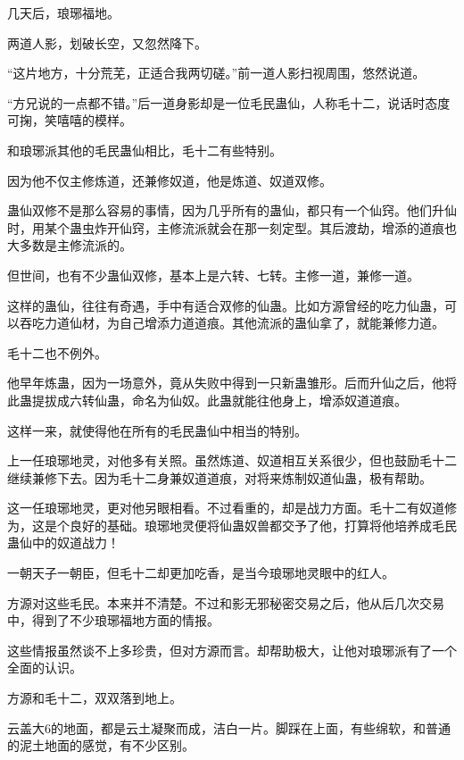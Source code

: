 
\begin{this_body}

几天后，琅琊福地。

两道人影，划破长空，又忽然降下。

“这片地方，十分荒芜，正适合我两切磋。”前一道人影扫视周围，悠然说道。

“方兄说的一点都不错。”后一道身影却是一位毛民蛊仙，人称毛十二，说话时态度可掬，笑嘻嘻的模样。

和琅琊派其他的毛民蛊仙相比，毛十二有些特别。

因为他不仅主修炼道，还兼修奴道，他是炼道、奴道双修。

蛊仙双修不是那么容易的事情，因为几乎所有的蛊仙，都只有一个仙窍。他们升仙时，用某个蛊虫炸开仙窍，主修流派就会在那一刻定型。其后渡劫，增添的道痕也大多数是主修流派的。

但世间，也有不少蛊仙双修，基本上是六转、七转。主修一道，兼修一道。

这样的蛊仙，往往有奇遇，手中有适合双修的仙蛊。比如方源曾经的吃力仙蛊，可以吞吃力道仙材，为自己增添力道道痕。其他流派的蛊仙拿了，就能兼修力道。

毛十二也不例外。

他早年炼蛊，因为一场意外，竟从失败中得到一只新蛊雏形。后而升仙之后，他将此蛊提拔成六转仙蛊，命名为仙奴。此蛊就能往他身上，增添奴道道痕。

这样一来，就使得他在所有的毛民蛊仙中相当的特别。

上一任琅琊地灵，对他多有关照。虽然炼道、奴道相互关系很少，但也鼓励毛十二继续兼修下去。因为毛十二身兼奴道道痕，对将来炼制奴道仙蛊，极有帮助。

这一任琅琊地灵，更对他另眼相看。不过看重的，却是战力方面。毛十二有奴道修为，这是个良好的基础。琅琊地灵便将仙蛊奴兽都交予了他，打算将他培养成毛民蛊仙中的奴道战力！

一朝天子一朝臣，但毛十二却更加吃香，是当今琅琊地灵眼中的红人。

方源对这些毛民。本来并不清楚。不过和影无邪秘密交易之后，他从后几次交易中，得到了不少琅琊福地方面的情报。

这些情报虽然谈不上多珍贵，但对方源而言。却帮助极大，让他对琅琊派有了一个全面的认识。

方源和毛十二，双双落到地上。

云盖大6的地面，都是云土凝聚而成，洁白一片。脚踩在上面，有些绵软，和普通的泥土地面的感觉，有不少区别。


\end{this_body}
